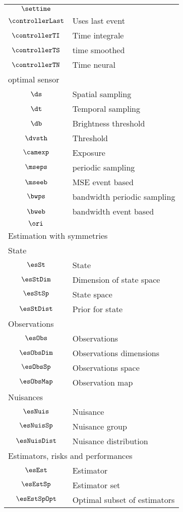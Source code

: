 \begin{longtable}{cl}
 $\settime$ & \\ 
 $\controllerLast$ &  Uses last event\\ 
 $\controllerTI$ &  Time integrale\\ 
 $\controllerTS$ &  time smoothed\\ 
 $\controllerTN$ &  Time neural\\ 
 \multicolumn{2}{l}{optimal sensor}\\ 
 \hline
$\ds$ &  Spatial sampling\\ 
 $\dt$ &  Temporal sampling\\ 
 $\db$ &  Brightness threshold\\ 
 $\dvsth$ &  Threshold\\ 
 $\camexp$ &  Exposure\\ 
 $\mseps$ &  periodic sampling\\ 
 $\mseeb$ &  MSE event based\\ 
 $\bwps$ &  bandwidth periodic sampling\\ 
 $\bweb$ &  bandwidth event based\\ 
 $\ori$ & \\ 
 \multicolumn{2}{l}{Estimation with symmetries}\\ 
 \hline
\multicolumn{2}{l}{State}\\ 
 \hline
$\esSt$ &  State\\ 
 $\esStDim$ &  Dimension of state space\\ 
 $\esStSp$ &  State space\\ 
 $\esStDist$ &  Prior for state\\ 
 \multicolumn{2}{l}{Observations}\\ 
 \hline
$\esObs$ &  Observations\\ 
 $\esObsDim$ &  Observations dimensions\\ 
 $\esObsSp$ &  Observations space\\ 
 $\esObsMap$ &  Observation map\\ 
 \multicolumn{2}{l}{Nuisances}\\ 
 \hline
$\esNuis$ &  Nuisance\\ 
 $\esNuisSp$ &  Nuisance group\\ 
 $\esNuisDist$ &  Nuisance distribution\\ 
 \multicolumn{2}{l}{Estimators, risks and performances}\\ 
 \hline
$\esEst$ &  Estimator\\ 
 $\esEstSp$ &  Estimator set\\ 
 $\esEstSpOpt$ &  Optimal subset of estimators\\ 

\end{longtable}

